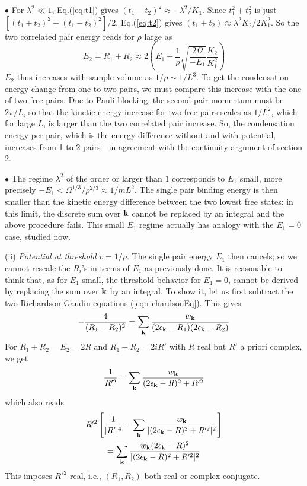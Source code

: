 \documentclass[5p,twocolumn]{elsarticle}
\begin{document}
$\bullet$ For $\lambda^{2}\ll1$, Eq.(\ref{eq:t1}) gives $(t_{1}-t_{2})^{2}\approx-\lambda^{2}/K_{1}$. Since $t_{1}^{2}+t_{2}^{2}$ is just $\left[(t_{1}+t_{2})^{2}+(t_{1}-t_{2})^{2}\right]/2$,  Eq.(\ref{eq:t2}) gives $(t_{1}+t_{2})\approx\lambda^{2}K_{2}/2K_{1}^{2}$.  So the two correlated pair energy  reads for $\rho$ large as 
\begin{equation}
E_{2}=R_{1}+R_{2}\approx2\left(E_{1}+\frac{1}{\rho}\sqrt{\frac{2\Omega}{-E_{1}}}\frac{K_{2}}{K_{1}^{2}}\right)
\end{equation}
$E_{2}$ thus increases with sample volume as $1/\rho\sim1/L^{3}$.
To get the condensation energy change from one to two pairs, we must compare this increase with the one of two free pairs.  Due to Pauli blocking, the second pair momentum must be $2\pi/L$, so that the kinetic energy increase for two free pairs scales as $1/L^{2}$, which for large $L$, is larger than the two correlated pair increase. 
So, the condensation energy per pair, which is the energy difference without and with potential, increases from 1 to 2 pairs - in agreement with the continuity argument of section 2. 

 $\bullet$ The regime $\lambda^{2}$ of the order or larger than $1$ corresponds to $E_{1}$ small, more precisely $-E_{1}<\Omega^{1/3}/\rho^{2/3}\approx1/mL^{2}$.  The single pair binding energy is then smaller than the kinetic energy difference between the two lowest free states: in this limit, the discrete sum over $\mathbf{k}$ cannot be replaced by an integral and the above procedure fails.  This small $E_1$ regime  actually has analogy with the $E_1=0$ case, studied now. 


(ii) {\it Potential at threshold} $v=1/\rho$. The single pair energy $E_1$ then cancels; so we cannot rescale the $R_i$'s in terms of $E_1$ as previously done. It is reasonable to think that, as for $E_1$ small, the threshold behavior for $E_1=0$, cannot be derived by replacing the sum over $\mathbf{k}$ by an integral.
To show it, let us first subtract the two Richardson-Gaudin equations (\ref{eq:richardsonEq}). This gives
\begin{equation}
-\frac{4}{(R_1-R_2)^2}=\sum_{\mathbf{k}}\frac{w_{\mathbf{k}}}{(2\epsilon_{\mathbf{k}}-R_1)(2\epsilon_{\mathbf{k}}-R_2)}\label{eq:2PairMinus}
\end{equation}
For $R_1+R_2=E_2=2R$ and $R_1-R_2=2iR'$ with $R$ real but $R'$ a priori complex, we get
\begin{equation}
\frac{1}{R'^2}=\sum_{\mathbf{k}}\frac{w_{\mathbf{k}}}{(2\epsilon_{\mathbf{k}}-R)^2+R'^2}
\end{equation}
which also reads 
\begin{multline}
R'^{2}\left[\frac{1}{|R'|^{4}}-\sum_{\mathbf{k}}\frac{w_{\mathbf{k}}}{|(2\epsilon_{\mathbf{k}}-R)^{2}+R'^{2}|^{2}}\right]\\
=\sum_{\mathbf{k}}\frac{w_{\mathbf{k}}(2\epsilon_{\mathbf{k}}-R)^{2}}{|(2\epsilon_{\mathbf{k}}-R)^{2}+R'^{2}|^{2}}
\end{multline}
This imposes $R'^2$ real, i.e., $(R_1,R_2)$ both real or complex conjugate.
\end{document}
